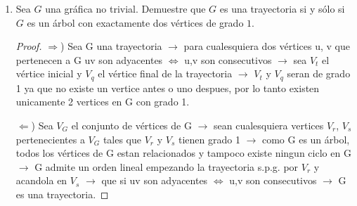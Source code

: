 \documentclass{article}
\begin{document}
\begin{enumerate}
  \item Sea $G$ una gr\'afica no trivial.   Demuestre
    que $G$ es una trayectoria si y s\'olo si $G$ es
    un \'arbol con exactamente dos v\'ertices de
    grado $1$.
    
    \begin{proof} 


      $\Longrightarrow$) Sea G una trayectoria $\rightarrow$ para cualesquiera dos vértices u, v que pertenecen  a G uv son adyacentes $\Leftrightarrow$ u,v son consecutivos  $\rightarrow$ sea $V_t$ el  vértice inicial y $V_q$ el  vértice final de la trayectoria  $\rightarrow$ $V_t$ y $V_q$ seran de grado 1 ya que no existe un vertice antes o uno despues, por lo tanto existen unicamente 2 vertices en G con grado 1.
      
      $\Longleftarrow$) Sea  $V_G$ el conjunto de vértices de G $\rightarrow$ sean cualesquiera vertices $V_r$, $V_s$ pertenecientes a $V_G$ tales que $V_r$ y $V_s$ tienen grado 1 $\rightarrow$  como G es un árbol, todos los vértices de G estan relacionados y tampoco existe ningun  ciclo en G $\rightarrow$  G admite un orden lineal empezando la trayectoria s.p.g. por $V_r$ y acandola en $V_s$ $\rightarrow$ que si uv son adyacentes  $\Leftrightarrow$ u,v son consecutivos  $\rightarrow$ G es una trayectoria.
      
      
      \end{proof}
   



\end{enumerate}
\end{document}
